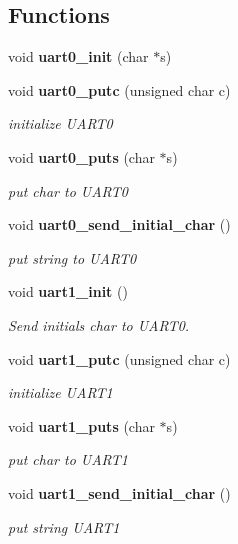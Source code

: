 \subsection*{Functions}
\begin{CompactItemize}
\item 
void {\bf uart0\_\-init} (char $\ast$s)
\item 
void {\bf uart0\_\-putc} (unsigned char c)
\begin{CompactList}\small\item\em initialize UART0 \item\end{CompactList}\item 
void {\bf uart0\_\-puts} (char $\ast$s)
\begin{CompactList}\small\item\em put char to UART0 \item\end{CompactList}\item 
void {\bf uart0\_\-send\_\-initial\_\-char} ()
\begin{CompactList}\small\item\em put string to UART0 \item\end{CompactList}\item 
void {\bf uart1\_\-init} ()
\begin{CompactList}\small\item\em Send initials char to UART0. \item\end{CompactList}\item 
void {\bf uart1\_\-putc} (unsigned char c)
\begin{CompactList}\small\item\em initialize UART1 \item\end{CompactList}\item 
void {\bf uart1\_\-puts} (char $\ast$s)
\begin{CompactList}\small\item\em put char to UART1 \item\end{CompactList}\item 
void {\bf uart1\_\-send\_\-initial\_\-char} ()
\begin{CompactList}\small\item\em put string UART1 \item\end{CompactList}\end{CompactItemize}


